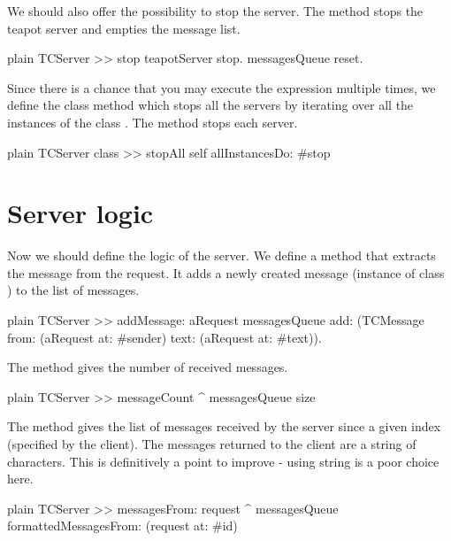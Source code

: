 \documentclass[10pt,twoside,english]{_support/latex/sbabook/sbabook}
\begin{document}
We should also offer the possibility to stop the server. The method  stops the teapot server and empties the message list. 

\begin{displaycode}{plain}
TCServer >> stop
	teapotServer stop.
	messagesQueue reset.
\end{displaycode}

Since there is a chance that you may execute the expression  multiple times, we define the class method   which stops all the servers by iterating over all the instances of the class . 
The method  stops each server. 

\begin{displaycode}{plain}
TCServer class >> stopAll
	self allInstancesDo: #stop
\end{displaycode}
\section{Server logic}
Now we should define the logic of the server.
We define a method  that extracts the message from the request. It adds a newly created message (instance of class ) to the list of messages.

\begin{displaycode}{plain}
TCServer >> addMessage: aRequest
	messagesQueue add: (TCMessage from: (aRequest at: #sender) text: (aRequest at: #text)).
\end{displaycode}

The method  gives the number of received messages. 

\begin{displaycode}{plain}
TCServer >> messageCount
	^ messagesQueue size
\end{displaycode}

The method  gives the list of messages received by the server since a given index (specified by the client).
The messages returned to the client are a string of characters. This is definitively a point to improve - using string is a poor choice here. 

\begin{displaycode}{plain}
TCServer >> messagesFrom: request
	^ messagesQueue formattedMessagesFrom: (request at: #id)  
\end{displaycode}
\end{document}
